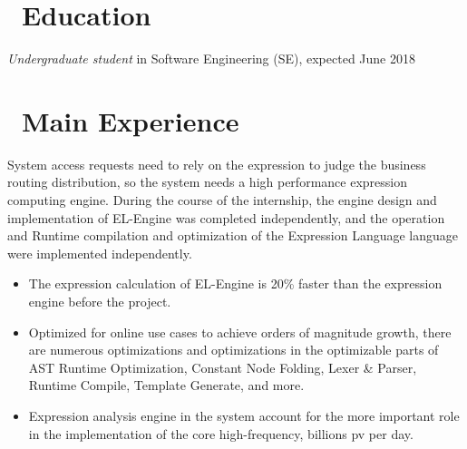 \documentclass{resume}
\begin{document}



\section{\faGraduationCap\ Education}
\textit{Undergraduate student} in Software Engineering (SE), expected June 2018

\section{\faUsers\ Main Experience}

System access requests need to rely on the expression to judge the business routing distribution, so the system needs a high performance expression computing engine. During the course of the internship, the engine design and implementation of EL-Engine was completed independently, and the operation and Runtime compilation and optimization of the Expression Language language were implemented independently.

\begin{itemize}
  \item The expression calculation of EL-Engine is 20\% faster than the expression engine before the project.
  \item Optimized for online use cases to achieve orders of magnitude growth, there are numerous optimizations and optimizations in the optimizable parts of AST Runtime Optimization, Constant Node Folding, Lexer \& Parser, Runtime Compile, Template Generate, and more.
  \item Expression analysis engine in the system account for the more important role in the implementation of the core high-frequency, billions pv per day.
\end{itemize}

\end{document}
